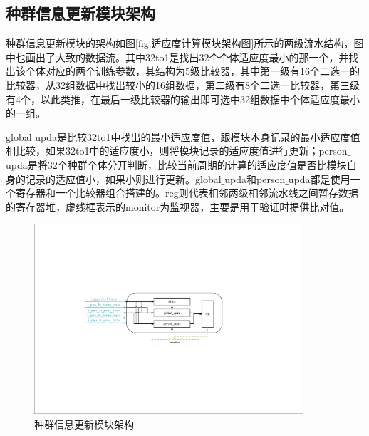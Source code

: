 \subsection{种群信息更新模块架构}
种群信息更新模块的架构如图\ref{fig:适应度计算模块架构图}所示的两级流水结构，图中也画出了大致的数据流。其中32to1是找出32个个体适应度最小的那一个，并找出该个体对应的两个训练参数，其结构为5级比较器，其中第一级有16个二选一的比较器，从32组数据中找出较小的16组数据，第二级有8个二选一比较器，第三级有4个，以此类推，在最后一级比较器的输出即可选中32组数据中个体适应度最小的一组。

global$\_$upda是比较32to1中找出的最小适应度值，跟模块本身记录的最小适应度值相比较，如果32to1中的适应度小，则将模块记录的适应度值进行更新；person$\_$upda是将32个种群个体分开判断，比较当前周期的计算的适应度值是否比模块自身的记录的适应值小，如果小则进行更新。global$\_$upda和person$\_$upda都是使用一个寄存器和一个比较器组合搭建的。reg则代表相邻两级相邻流水线之间暂存数据的寄存器堆，虚线框表示的monitor为监视器，主要是用于验证时提供比对值。


\begin{figure}[htb]
    \centering
    \includegraphics[width=10cm]{fig/5-fig/种群信息更新模块架构.pdf}
    \caption{种群信息更新模块架构}
    \label{fig:种群信息更新模块架构}
\end{figure}

